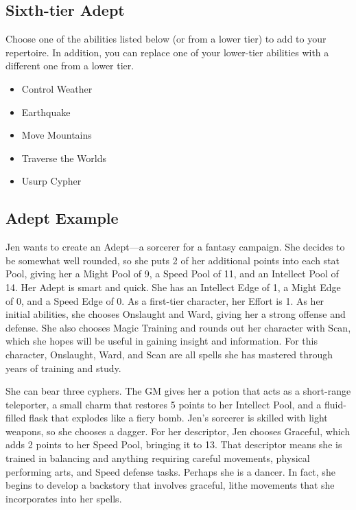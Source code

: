 \begin{multicols}{2}
\subsection{Sixth-tier Adept}

Choose one of the abilities listed below (or from a lower tier) to add to your repertoire. In addition, you can replace one of your lower-tier abilities with a different one from a lower tier.

\begin{itemize}
\item Control Weather
\item Earthquake
\item Move Mountains
\item Traverse the Worlds
\item Usurp Cypher
\end{itemize}

\subsection{Adept Example}

Jen wants to create an Adept—a sorcerer for a fantasy campaign. She decides to be somewhat well rounded, so she puts 2 of her additional points into each stat Pool, giving her a Might Pool of 9, a Speed Pool of 11, and an Intellect Pool of 14. Her Adept is smart and quick. She has an Intellect Edge of 1, a Might Edge of 0, and a Speed Edge of 0. As a first-tier character, her Effort is 1. As her initial abilities, she chooses Onslaught and Ward, giving her a strong offense and defense. She also chooses Magic Training and rounds out her character with Scan, which she hopes will be useful in gaining insight and information. For this character, Onslaught, Ward, and Scan are all spells she has mastered through years of training and study.

She can bear three cyphers. The GM gives her a potion that acts as a short-range teleporter, a small charm that restores 5 points to her Intellect Pool, and a fluid-filled flask that explodes like a fiery bomb. Jen’s sorcerer is skilled with light weapons, so she chooses a dagger. 
For her descriptor, Jen chooses Graceful, which adds 2 points to her Speed Pool, bringing it to 13. That descriptor means she is trained in balancing and anything requiring careful movements, physical performing arts, and Speed defense tasks. Perhaps she is a dancer. In fact, she begins to develop a backstory that involves graceful, lithe movements that she incorporates into her spells.


\end{multicols}
